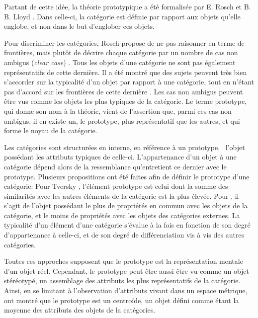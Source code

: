 Partant de cette idée, la théorie prototypique a été formalisée par E. Rosch et B. B. Lloyd \citep{rosch1978cognition}. Dans celle-ci, la catégorie est définie par rapport aux objets qu'elle englobe, et non dans le but d'englober ces objets.

Pour discriminer les catégories, Rosch propose de ne pas raisonner en terme de frontières, mais plutôt de décrire chaque catégorie par un nombre de cas non ambigus (\emph{clear case}) \citep[p. 36]{rosch1978cognition}. Tous les objets d'une catégorie ne sont pas également représentatifs de cette dernière. Il a été montré que des sujets peuvent très bien s'accorder sur la typicalité d'un objet par rapport à une catégorie, tout en n'étant pas d'accord sur les frontières de cette dernière \citep{rosch1974human,rosch1975cognitive}. Les cas non ambigus peuvent être vus comme les objets les plus typiques de la catégorie. Le terme prototype, qui donne son nom à la théorie, vient de l'assertion que, parmi ces cas non ambigus, il en existe un, le prototype, plus représentatif que les autres, et qui forme le noyau de la catégorie.

Les catégories sont structurées en interne, en référence à un prototype, \ie~l'objet possédant les attributs typiques de celle-ci. L'appartenance d'un objet à une catégorie dépend alors de la ressemblance qu'entretient ce dernier avec le prototype.  Plusieurs propositions ont été faites afin de définir le prototype d'une catégorie: Pour Tversky \citep{tversky1977features}, l'élément prototype est celui dont la somme des similarités avec les autres éléments de la catégorie est la plus élevée. Pour \citep{rosch1975family}, il s'agit de l'objet possédant le plus de propriétés en commun avec les objets de la catégorie, et le moins de propriétés avec les objets des catégories externes. La typicalité d'un élément d'une catégorie s'évalue à la fois en fonction de son degré d'appartenance à celle-ci, et de son degré de différenciation vis à vis des autres catégories. 

Toutes ces approches supposent que le prototype est la représentation mentale d'un objet réel. Cependant, le prototype peut être aussi être vu comme un objet stéréotypé, un assemblage des attributs les plus représentatifs de la catégorie. Ainsi, en se limitant à l'observation d'attributs vivant dans un espace métrique, \citep{reed1972pattern, rosch1976structural} ont montré que le prototype est un centroïde, un objet défini comme étant la moyenne des attributs des objets de la catégories. 

